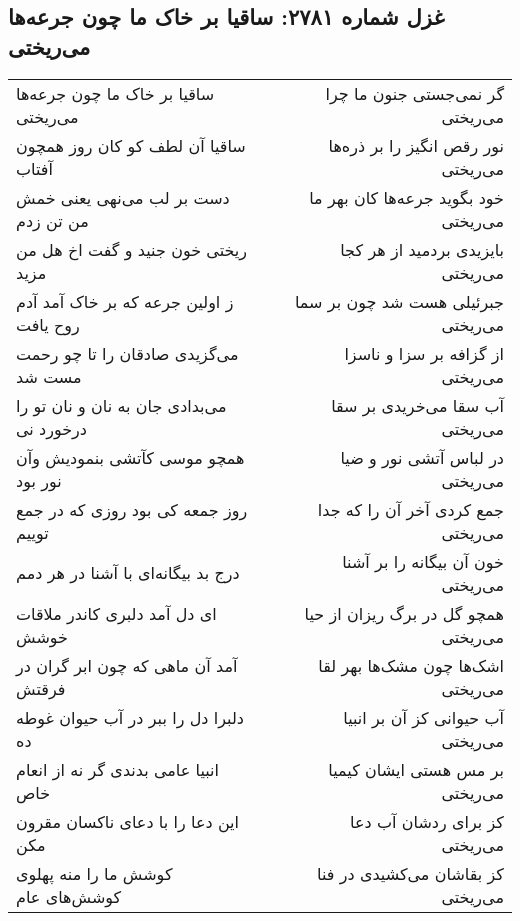 \begin{center}
\section*{غزل شماره ۲۷۸۱: ساقیا بر خاک ما چون جرعه‌ها می‌ریختی}
\label{sec:2781}
\begin{longtable}{l p{0.5cm} r}
ساقیا بر خاک ما چون جرعه‌ها می‌ریختی
&&
گر نمی‌جستی جنون ما چرا می‌ریختی
\\
ساقیا آن لطف کو کان روز همچون آفتاب
&&
نور رقص انگیز را بر ذره‌ها می‌ریختی
\\
دست بر لب می‌نهی یعنی خمش من تن زدم
&&
خود بگوید جرعه‌ها کان بهر ما می‌ریختی
\\
ریختی خون جنید و گفت اخ هل من مزید
&&
بایزیدی بردمید از هر کجا می‌ریختی
\\
ز اولین جرعه که بر خاک آمد آدم روح یافت
&&
جبرئیلی هست شد چون بر سما می‌ریختی
\\
می‌گزیدی صادقان را تا چو رحمت مست شد
&&
از گزافه بر سزا و ناسزا می‌ریختی
\\
می‌بدادی جان به نان و نان تو را درخورد نی
&&
آب سقا می‌خریدی بر سقا می‌ریختی
\\
همچو موسی کآتشی بنمودیش وآن نور بود
&&
در لباس آتشی نور و ضیا می‌ریختی
\\
روز جمعه کی بود روزی که در جمع توییم
&&
جمع کردی آخر آن را که جدا می‌ریختی
\\
درج بد بیگانه‌ای با آشنا در هر دمم
&&
خون آن بیگانه را بر آشنا می‌ریختی
\\
ای دل آمد دلبری کاندر ملاقات خوشش
&&
همچو گل در برگ ریزان از حیا می‌ریختی
\\
آمد آن ماهی که چون ابر گران در فرقتش
&&
اشک‌ها چون مشک‌ها بهر لقا می‌ریختی
\\
دلبرا دل را ببر در آب حیوان غوطه ده
&&
آب حیوانی کز آن بر انبیا می‌ریختی
\\
انبیا عامی بدندی گر نه از انعام خاص
&&
بر مس هستی ایشان کیمیا می‌ریختی
\\
این دعا را با دعای ناکسان مقرون مکن
&&
کز برای ردشان آب دعا می‌ریختی
\\
کوشش ما را منه پهلوی کوشش‌های عام
&&
کز بقاشان می‌کشیدی در فنا می‌ریختی
\\
\end{longtable}
\end{center}
